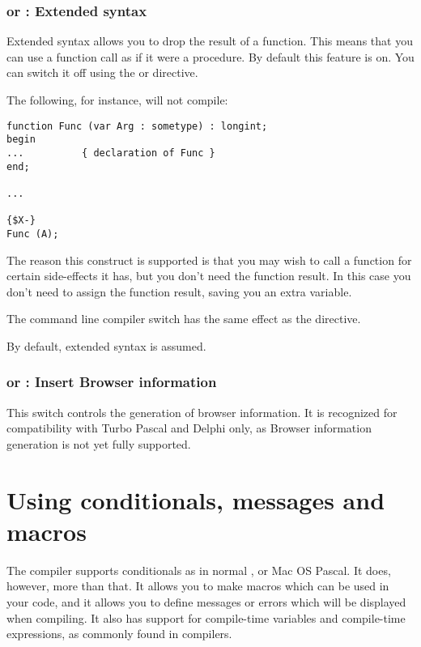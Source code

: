 \subsection{ or  : Extended syntax}

Extended syntax allows you to drop the result of a function. This means that
you can use a function call as if it were a procedure. By default this feature
is on. You can switch it off using the  or
directive.

The following, for instance, will not compile:
\begin{verbatim}
function Func (var Arg : sometype) : longint;
begin
...          { declaration of Func }
end;

...

{$X-}
Func (A);
\end{verbatim}
The reason this construct is supported is that you may wish to call a
function for certain side-effects it has, but you don't need the function
result. In this case you don't need to assign the function result, saving
you an extra variable.

The command line compiler switch  has the same effect as the
 directive.

By default, extended syntax is assumed.


\subsection{ or  : Insert Browser information}

This switch controls the generation of browser information. It is recognized
for compatibility with Turbo Pascal and Delphi only, as Browser information
generation is not yet fully supported.


\chapter{Using conditionals, messages and macros}
\label{ch:CondMessageMacro}
The \fpc compiler supports conditionals as in normal \tp, \delphi or Mac OS
Pascal. It does, however, more than that. It allows you to make macros which can be used in
your code, and it allows you to define messages or errors which will be
displayed when compiling. It also has support for compile-time variables and
compile-time expressions, as commonly found in \macos compilers.

